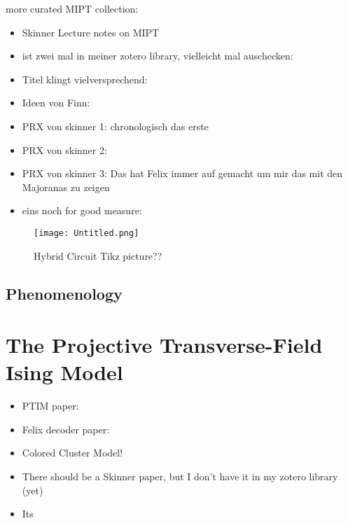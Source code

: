 more curated MIPT collection:
\begin{itemize}
  \item Skinner Lecture notes on MIPT
    \cite{skinnerLectureNotesIntroduction2023}
  \item ist zwei mal in meiner zotero library, vielleicht mal auschecken: 
    \cite{hokeMeasurementinducedEntanglementTeleportation2023}
  \item Titel klingt vielversprechend: \cite{baoTheoryPhaseTransition2020}
  \item Ideen von Finn: \cite{joshiObservingQuantumMpemba2024,aresEntanglementAsymmetryProbe2023}
  \item PRX von skinner 1: \cite{skinnerMeasurementInducedPhaseTransitions2019}
    chronologisch das erste
  \item PRX von skinner 2: \cite{nahumMeasurementEntanglementPhase2021}
  \item PRX von skinner 3:
    \cite{nahumEntanglementDynamicsDiffusionannihilation2020}
    Das hat Felix immer auf gemacht um mir das mit den Majoranas zu zeigen
  \item eins noch for good measure:
    \cite{yoshidaDecodingEntanglementStructure2021}
\end{itemize}
%  
\begin{figure}[H]
  \centering
  \texttt{[image: Untitled.png]}
  \caption{Hybrid Circuit Tikz picture??}
  \label{fig:hybrid-circuit}
\end{figure}

\subsection{Phenomenology}

\section{The Projective Transverse-Field Ising Model}\label{sec:intro-ptim}
\begin{itemize}
  \item PTIM paper: 
    \cite{langEntanglementTransitionProjective2020}
  \item Felix decoder paper: 
    \cite{roserDecodingProjectiveTransverse2023}
  \item Colored Cluster Model!
  \item There should be a Skinner paper, but I don't have it in my zotero
    library (yet)
  \item Its \cite{nahumEntanglementDynamicsDiffusionannihilation2020}
\end{itemize}


